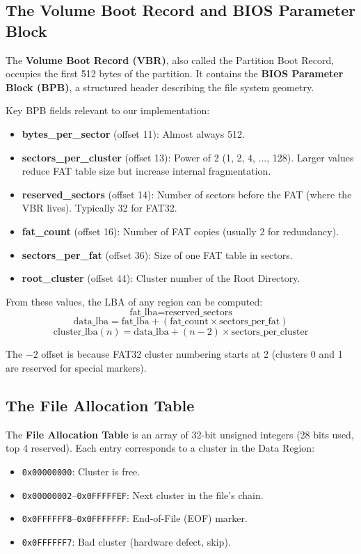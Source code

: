 \documentclass[12pt,a4paper]{report}
\begin{document}
\subsection{The Volume Boot Record and BIOS Parameter Block}

The \textbf{Volume Boot Record (VBR)}, also called the Partition Boot Record, occupies
the first 512 bytes of the partition. It contains the \textbf{BIOS Parameter Block (BPB)},
a structured header describing the file system geometry.

Key BPB fields relevant to our implementation:
\begin{itemize}
    \item \textbf{bytes\_per\_sector} (offset 11): Almost always 512.
    \item \textbf{sectors\_per\_cluster} (offset 13): Power of 2 (1, 2, 4, ..., 128).
    Larger values reduce FAT table size but increase internal fragmentation.
    \item \textbf{reserved\_sectors} (offset 14): Number of sectors before the FAT
    (where the VBR lives). Typically 32 for FAT32.
    \item \textbf{fat\_count} (offset 16): Number of FAT copies (usually 2 for redundancy).
    \item \textbf{sectors\_per\_fat} (offset 36): Size of one FAT table in sectors.
    \item \textbf{root\_cluster} (offset 44): Cluster number of the Root Directory.
\end{itemize}

From these values, the LBA of any region can be computed:
\[
\text{fat\_lba} = \text{reserved\_sectors}
\]
\[
\text{data\_lba} = \text{fat\_lba} + (\text{fat\_count} \times \text{sectors\_per\_fat})
\]
\[
\text{cluster\_lba}(n) = \text{data\_lba} + (n - 2) \times \text{sectors\_per\_cluster}
\]

The $-2$ offset is because FAT32 cluster numbering starts at 2 (clusters 0 and 1
are reserved for special markers).

\subsection{The File Allocation Table}

The \textbf{File Allocation Table} is an array of 32-bit unsigned integers (28 bits
used, top 4 reserved). Each entry corresponds to a cluster in the Data Region:
\begin{itemize}
    \item \texttt{0x00000000}: Cluster is free.
    \item \texttt{0x00000002}--\texttt{0x0FFFFFEF}: Next cluster in the file's chain.
    \item \texttt{0x0FFFFFF8}--\texttt{0x0FFFFFFF}: End-of-File (EOF) marker.
    \item \texttt{0x0FFFFFF7}: Bad cluster (hardware defect, skip).
\end{itemize}
\end{document}
